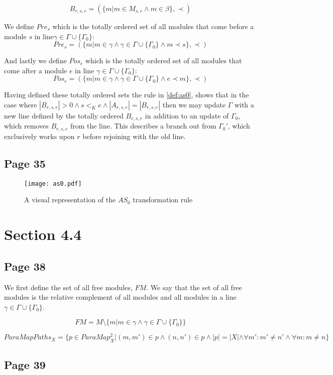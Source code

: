 \[B_{r,s,e} = (\{m |m \in M_{s,e} \land m \in \beta\}, \prec)\]

We define $Pre_{s}$ which is the totally ordered set of all modules that come before a module $s$ in line$\gamma \in \Gamma \cup \{\Gamma_0\} $:
\[Pre_{s} = (\{m | m \in \gamma \land \gamma \in \Gamma \cup \{\Gamma_0\} \land m \prec s\}, \prec)\]

And lastly we define $Pos_{e}$ which is the totally ordered set of all modules that come after a module $e$  in line $\gamma \in \Gamma \cup \{\Gamma_0\} $:
\[Pos_{e} = (\{m | m \in \gamma \land \gamma \in \Gamma \cup \{\Gamma_0\} \land e \prec  m \}, \prec)\]

Having defined these totally ordered sets the rule in \cref{def:as0}, shows that in the case where $|B_{r,s,e}| > 0 \land s <_K e \land |A_{r,s,e}| = |B_{r,s,e}|$ then we may update $\Gamma$ with a new line defined by the totally  ordered $B_{r,s,e}$ in addition to an update of $\Gamma_0$, which removes $B_{r,s,e}$ from the line. This describes a branch out from $\Gamma_0'$, which exclusively works upon $r$ before rejoining with the old line. 

\subsection*{Page 35}
\begin{figure}[H]
\centering
\texttt{[image: as0.pdf]}
\caption{A visual representation of the $AS_0$ transformation rule}
\label{fig:as0}
\end{figure}

\section*{Section 4.4}
\subsection*{Page 38}
We first define the set of all free modules, $FM$. We say that the set of all free modules is the relative complement of all modules and all modules in a line $\gamma \in \Gamma \cup \{\Gamma_0\}$.

\[FM = M \setminus \{m | m \in \gamma \land \gamma \in \Gamma \cup \{\Gamma_0\}\}\]


\[ParaMapPaths_{X} = \{p \in ParaMap_{X}^2 | (m,m') \in p \land (n,n') \in p \land |p| = |X| \land  \forall m': m' \neq n' \land  \forall m: m \neq n \}\]

\subsection*{Page 39}

